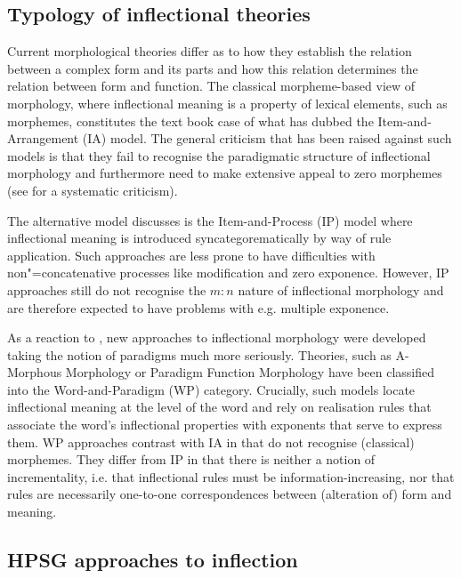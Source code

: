 \documentclass[output=paper
                ,modfonts
                ,nonflat
	        ,collection
	        ,collectionchapter
	        ,collectiontoclongg
 	        ,biblatex
                ,babelshorthands
                ,newtxmath
                ,draftmode
                ,colorlinks, citecolor=brown
]{./langsci/langscibook}
\begin{document}
{\subsection{Typology of inflectional theories}
\label{sec:InflTypology}

Current morphological theories differ as to how they establish the
relation between a complex form and its parts and how this relation
determines the relation between form and function. The classical
morpheme-based view of morphology, where inflectional meaning is a
property of lexical elements, such as morphemes, constitutes the text
book case of what \cite{Hockett54} has dubbed the Item-and-Arrangement
(IA) model.  The general criticism that has been raised against such
models is that they fail to recognise the paradigmatic structure of
inflectional morphology and furthermore need to make extensive appeal
to zero morphemes (see \citealp{Anderson92} for a systematic
criticism).

The alternative model \citet{Hockett54} discusses is the
Item-and-Process (IP) model where inflectional meaning is introduced
syncategorematically by way of rule application. Such approaches
are less prone to have difficulties with non"=concatenative processes
like modification and zero exponence. However, IP approaches still do
not recognise the $m:n$ nature of inflectional morphology and are
therefore expected to have problems with e.g. multiple exponence. 


As a reaction to \citet{Matthews72}, new approaches to inflectional
morphology were developed taking the notion of paradigms much more
seriously. Theories, such as A-Morphous Morphology \citep{Anderson92}
or Paradigm Function Morphology \citep{Stump01} have been classified
into the Word-and-Paradigm (WP) category. Crucially, such models
locate inflectional meaning at the level of the word and rely on
realisation rules that associate the word's inflectional properties
with exponents that serve to express them. WP approaches contrast with
IA in that do not recognise (classical) morphemes. They differ
from IP in that there is neither a  notion of incrementality,
i.e. that inflectional rules must be information-increasing, nor that
rules are necessarily one-to-one correspondences between (alteration
of) form and meaning. 


\subsection{HPSG approaches to inflection}
\label{sec:InflHPSG}

}
\end{document}
